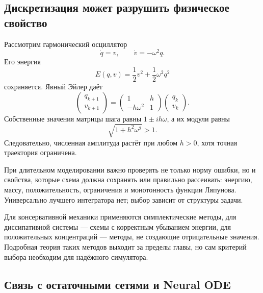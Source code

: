 \subsection{Дискретизация может разрушить физическое свойство}

Рассмотрим гармонический осциллятор
\begin{equation}
\label{eq:harmonic-oscillator-v04}
\dot q=v,
\qquad
\dot v=-\omega^2 q.
\end{equation}
Его энергия
\[
E(q,v)=\frac12v^2+\frac12\omega^2q^2
\]
сохраняется. Явный Эйлер даёт
\begin{equation}
\label{eq:euler-harmonic-update-v04}
\begin{pmatrix}
q_{k+1}\\
v_{k+1}
\end{pmatrix}
=
\begin{pmatrix}
1 & h\\
-h\omega^2 & 1
\end{pmatrix}
\begin{pmatrix}
q_k\\v_k
\end{pmatrix}.
\end{equation}
Собственные значения матрицы шага равны $1\pm ih\omega$, а их модули равны
\[
\sqrt{1+h^2\omega^2}>1.
\]
Следовательно, численная амплитуда растёт при любом $h>0$, хотя точная траектория ограничена.

\begin{principle}
\label{pr:structure-preserving-discretization-v04}
При длительном моделировании важно проверять не только норму ошибки, но и свойства, которые схема должна сохранять или правильно рассеивать: энергию, массу, положительность, ограничения и монотонность функции Ляпунова. Универсально лучшего интегратора нет; выбор зависит от структуры задачи.
\end{principle}

Для консервативной механики применяются симплектические методы, для диссипативной системы --- схемы с корректным убыванием энергии, для положительных концентраций --- методы, не создающие отрицательные значения. Подробная теория таких методов выходит за пределы главы, но сам критерий выбора необходим для надёжного симулятора.

\subsection{Связь с остаточными сетями и Neural ODE}

